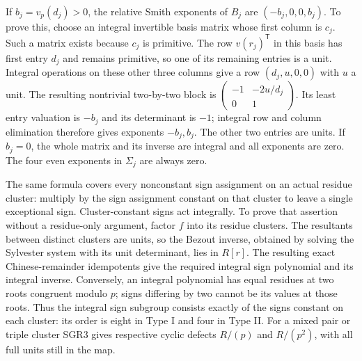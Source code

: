 If $b_j=v_p(d_j)>0$, the relative Smith exponents of $B_j$ are
$(-b_j,0,0,b_j)$. To prove this, choose an integral invertible basis
matrix whose first column is $c_j$. Such a matrix exists because
$c_j$ is primitive. The row $v(r_j)^{\mathsf T}$ in this basis has
first entry $d_j$ and remains primitive, so one of its remaining
entries is a unit. Integral operations on these other three columns
give a row $(d_j,u,0,0)$ with $u$ a unit. The resulting nontrivial
two-by-two block is
$\left(\begin{smallmatrix}-1&-2u/d_j\\0&1\end{smallmatrix}\right)$.
Its least entry valuation is $-b_j$ and its determinant is $-1$;
integral row and column elimination therefore gives exponents
$-b_j,b_j$. The other two entries are units. If $b_j=0$, the whole
matrix and its inverse are integral and all exponents are zero.
The four even exponents in $\Sigma_j$ are always zero.

The same formula covers every nonconstant sign assignment on an actual
residue cluster: multiply by the sign assignment constant on that
cluster to leave a single exceptional sign. Cluster-constant signs
act integrally. To prove that assertion without a residue-only
argument, factor $f$ into its residue clusters. The resultants between
distinct clusters are units, so the Bezout inverse, obtained by solving
the Sylvester system with its unit determinant, lies in $R[r]$.
The resulting exact Chinese-remainder idempotents give the required
integral sign polynomial and its integral inverse. Conversely, an
integral polynomial has equal residues at two roots congruent modulo
$p$; signs differing by two cannot be its values at those roots.
Thus the integral sign subgroup consists exactly of the signs constant
on each cluster: its order is eight in Type I and four in Type II.
For a mixed pair or triple cluster SGR3 gives respective cyclic
defects $R/(p)$ and $R/(p^2)$, with all full units still in the map.

